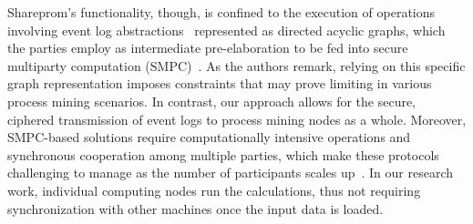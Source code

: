 Shareprom's functionality, though, is confined to the execution of operations involving event log abstractions~\citep{FederatedPM2021} represented as directed acyclic graphs, which the parties employ as intermediate pre-elaboration to be fed into secure multiparty computation (SMPC)~\citep{SMPC2015}. As the authors remark, %
relying on this specific graph representation imposes constraints that may prove limiting in various process mining scenarios.
In contrast, our approach allows for the secure, ciphered transmission of event logs to process mining nodes as a whole. %
Moreover, SMPC-based solutions require computationally intensive operations and synchronous cooperation among multiple parties, which make these protocols challenging to manage as the number of participants scales up~\citep{SMPC2019}. In our research work, %
individual computing nodes run the calculations, %
thus not requiring synchronization with other machines once the input data is loaded. %

